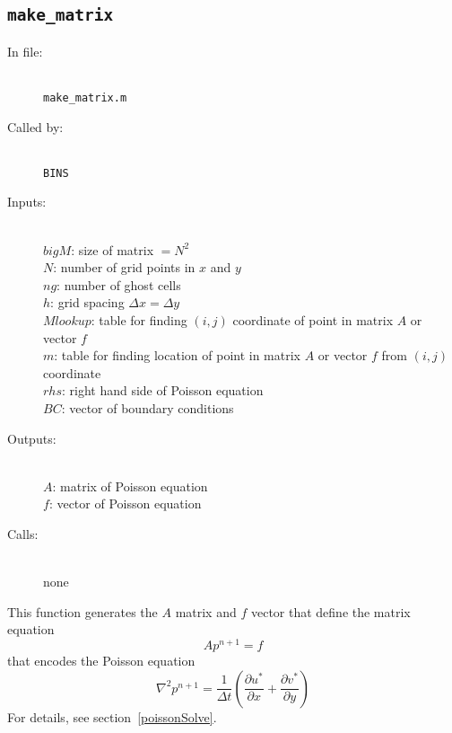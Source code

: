 \documentclass[12pt]{article}
\begin{document}
\subsection{\texttt{make\_matrix}}
\begin{description}
\item[In file:] \hfill \\ \texttt{make\_matrix.m}
\item[Called by:] \hfill \\ \texttt{BINS}
\item[Inputs:] \hfill \\ $bigM$: size of matrix $= N^2$ \\ $N$: number of grid points in $x$ and $y$ \\ $ng$: number of ghost cells \\ $h$: grid spacing $\Delta x = \Delta y$ \\ $Mlookup$: table for finding $(i,j)$ coordinate of point in matrix $A$ or vector $f$ \\ $m$: table for finding location of point in matrix $A$ or vector $f$ from $(i,j)$ coordinate \\ $rhs$: right hand side of Poisson equation \\ $BC$: vector of boundary conditions
\item[Outputs:] \hfill \\ $A$: matrix of Poisson equation \\ $f$: vector of Poisson equation
\item[Calls:] \hfill \\ none
\end{description}
This function generates the $A$ matrix and $f$ vector that define the matrix equation
\[ Ap^{n+1} = f\]
that encodes the Poisson equation
\[ \nabla^2 p^{n+1} = \frac{1}{\Delta t}\left( \frac{\partial u^*}{\partial x} + \frac{\partial v^*}{\partial y} \right) \]
For details, see section~\ref{poissonSolve}.
\end{document}

